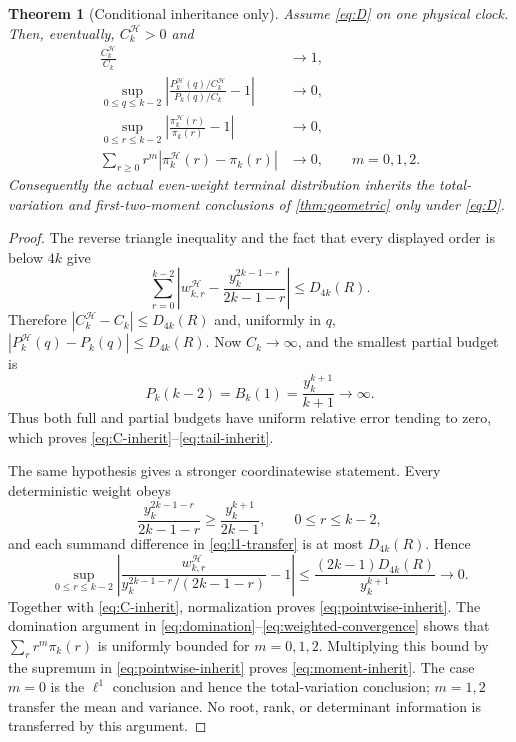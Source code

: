 \documentclass[11pt]{article}
\newtheorem{theorem}{Theorem}[section]
\theoremstyle{remark}
\newcommand{\cH}{\mathcal H}
\begin{document}
\begin{theorem}[Conditional inheritance only]\label{thm:conditional}
Assume \eqref{eq:D} on one physical clock.  Then, eventually,
$C_k^{\cH}>0$ and
\begin{align}
 \frac{C_k^{\cH}}{C_k}&\longrightarrow1,\label{eq:C-inherit}\\
 \sup_{0\le q\le k-2}
 \left|
 \frac{P_k^{\cH}(q)/C_k^{\cH}}{P_k(q)/C_k}-1
 \right|&\longrightarrow0,\label{eq:tail-inherit}\\
 \sup_{0\le r\le k-2}
 \left|\frac{\pi_k^{\cH}(r)}{\pi_k(r)}-1\right|
 &\longrightarrow0,\label{eq:pointwise-inherit}\\
 \sum_{r\ge0}r^m|\pi_k^{\cH}(r)-\pi_k(r)|
 &\longrightarrow0,\qquad m=0,1,2.\label{eq:moment-inherit}
\end{align}
Consequently the actual even-weight terminal distribution inherits
the total-variation and first-two-moment conclusions of
\cref{thm:geometric} only under \eqref{eq:D}.
\end{theorem}

\begin{proof}
The reverse triangle inequality and the fact that every displayed order is
below $4k$ give
\begin{equation}\label{eq:l1-transfer}
 \sum_{r=0}^{k-2}
 \left|w_{k,r}^{\cH}-\frac{y_k^{2k-1-r}}{2k-1-r}\right|
 \le D_{4k}(R).
\end{equation}
Therefore $|C_k^{\cH}-C_k|\le D_{4k}(R)$ and, uniformly in $q$,
$|P_k^{\cH}(q)-P_k(q)|\le D_{4k}(R)$.  Now
$C_k\to\infty$, and the smallest partial budget is
\[
 P_k(k-2)=B_k(1)=\frac{y_k^{k+1}}{k+1}\longrightarrow\infty.
\]
Thus both full and partial budgets have uniform relative error tending to
zero, which proves \eqref{eq:C-inherit}--\eqref{eq:tail-inherit}.

The same hypothesis gives a stronger coordinatewise statement.  Every
deterministic weight obeys
\[
 \frac{y_k^{2k-1-r}}{2k-1-r}
 \ge \frac{y_k^{k+1}}{2k-1},
 \qquad 0\le r\le k-2,
\]
and each summand difference in \eqref{eq:l1-transfer} is at most
$D_{4k}(R)$.  Hence
\[
 \sup_{0\le r\le k-2}
 \left|
 \frac{w_{k,r}^{\cH}}{y_k^{2k-1-r}/(2k-1-r)}-1
 \right|
 \le \frac{(2k-1)D_{4k}(R)}{y_k^{k+1}}\longrightarrow0.
\]
Together with \eqref{eq:C-inherit}, normalization proves
\eqref{eq:pointwise-inherit}.  The domination argument in
\eqref{eq:domination}--\eqref{eq:weighted-convergence} shows that
$\sum_r r^m\pi_k(r)$ is uniformly bounded for $m=0,1,2$.  Multiplying this
bound by the supremum in \eqref{eq:pointwise-inherit} proves
\eqref{eq:moment-inherit}.  The case $m=0$ is the $\ell^1$ conclusion and
hence the total-variation conclusion; $m=1,2$ transfer the mean and variance.
No root, rank, or determinant information is transferred by this argument.
\end{proof}
\end{document}
